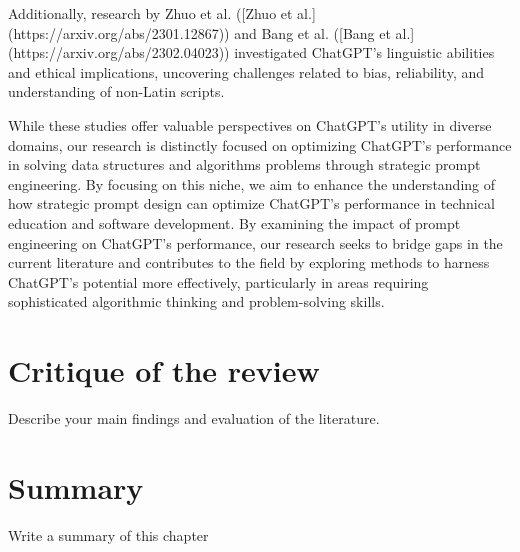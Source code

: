 Additionally, research by Zhuo et al. ([Zhuo et al.](https://arxiv.org/abs/2301.12867)) and Bang et al. ([Bang et al.](https://arxiv.org/abs/2302.04023)) investigated ChatGPT's linguistic abilities and ethical implications, uncovering challenges related to bias, reliability, and understanding of non-Latin scripts.

While these studies offer valuable perspectives on ChatGPT's utility in diverse domains, our research is distinctly focused on optimizing ChatGPT's performance in solving data structures and algorithms problems through strategic prompt engineering. By focusing on this niche, we aim to enhance the understanding of how strategic prompt design can optimize ChatGPT's performance in technical education and software development. By examining the impact of prompt engineering on ChatGPT's performance, our research seeks to bridge gaps in the current literature and contributes to the field by exploring methods to harness ChatGPT's potential more effectively, particularly in areas requiring sophisticated algorithmic thinking and problem-solving skills.






\section{Critique of the review} %
Describe your main findings and evaluation of the literature. ~\\

\section{Summary} 
Write a summary of this chapter~\\
